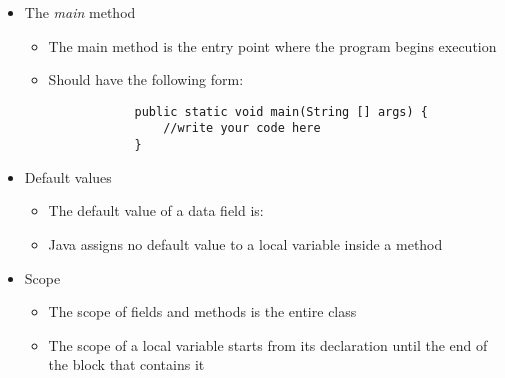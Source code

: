 \begin{itemize}
	\item The \textit{main} method
	\begin{itemize}
		\item The main method is the entry point where the program begins
		execution
		\item Should have the following form:
		\begin{Verbatim}
			public static void main(String [] args) {
				//write your code here
			}
		\end{Verbatim}
	\end{itemize}

	\item Default values
	\begin{itemize}
		\item The default value of a data field is:
		\item Java assigns no default value to a local variable inside a method
	\end{itemize}

	\item Scope
	\begin{itemize}
		\item The scope of fields and methods is the entire class
		\item The scope of a local variable starts from its declaration until the end
		of the block that contains it
	\end{itemize}


\end{itemize}
